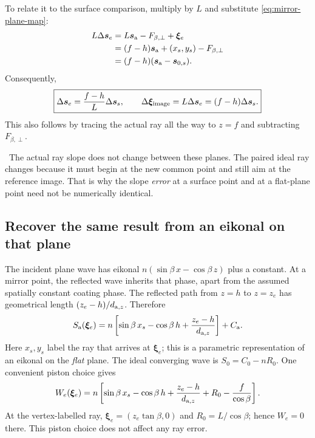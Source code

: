 \documentclass[11pt,a4paper]{article}
\numberwithin{equation}{section}
\newcommand{\vct}[1]{\bm{#1}}
\newcommand{\note}[1]{\par\smallskip\noindent{\color{accent}\textbf{Interpretation.}}\ #1\par\smallskip}
\begin{document}
To relate it to the surface comparison, multiply by $L$ and substitute
\eqref{eq:mirror-plane-map}:
\begin{align}
 L\Delta\vct s_e
 &=L\vct s_{\rm a}-F_{\beta,\perp}+\vct\xi_e\\
 &=(f-h)\vct s_{\rm a}+(x_s,y_s)-F_{\beta,\perp}\\
 &=(f-h)(\vct s_{\rm a}-\vct s_{0,s}).
\end{align}
Consequently,
\begin{equation}
 \boxed{\Delta\vct s_e=\frac{f-h}{L}\Delta\vct s_s,\qquad
 \Delta\vct\xi_{\rm image}
 =L\Delta\vct s_e=(f-h)\Delta\vct s_s.}
 \label{eq:mirror-scaling}
\end{equation}
This also follows by tracing the actual ray all the way to $z=f$ and
subtracting $F_{\beta,\perp}$.

\note{The actual ray slope does not change between these planes.
The paired ideal ray changes because it must begin at the new common
point and still aim at the reference image. That is why the slope
\emph{error} at a surface point and at a flat-plane point need not be
numerically identical.}

\subsection{Recover the same result from an eikonal on that plane}
The incident plane wave has eikonal
$n(\sin\beta\,x-\cos\beta\,z)$ plus a constant.
At a mirror point, the reflected wave inherits that phase, apart from
the assumed spatially constant coating phase.
The reflected path from $z=h$ to $z=z_e$ has geometrical length
$(z_e-h)/d_{{\rm a},z}$. Therefore
\begin{equation}
 S_{\rm a}(\vct\xi_e)
 =n\left[\sin\beta\,x_s-\cos\beta\,h
        +\frac{z_e-h}{d_{{\rm a},z}}\right]+C_{\rm a}.
 \label{eq:mirror-actual-eikonal}
\end{equation}
Here $x_s,y_s$ label the ray that arrives at $\vct\xi_e$; this is a
parametric representation of an eikonal on the \emph{flat} plane.
The ideal converging wave is $S_0=C_0-nR_0$.
One convenient piston choice gives
\begin{equation}
 W_e(\vct\xi_e)
 =n\left[\sin\beta\,x_s-\cos\beta\,h
        +\frac{z_e-h}{d_{{\rm a},z}}
        +R_0-\frac{f}{\cos\beta}\right].
 \label{eq:mirror-opd}
\end{equation}
At the vertex-labelled ray,
$\vct\xi_e=(z_e\tan\beta,0)$ and
$R_0=L/\cos\beta$; hence $W_e=0$ there.
This piston choice does not affect any ray error.
\end{document}
